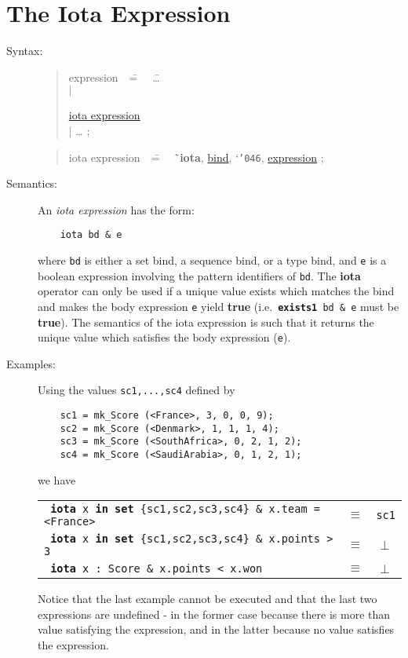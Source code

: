 \documentclass{overturerepchap}
\newcommand{\Lit}[1]{`{\tt #1}\Quote}
\newcommand{\Rule}[2]{
  \begin{quote}\begin{tabbing}
    #1\index{#1}\ \ \= = \ \ \= #2  ; %

  \end{tabbing}\end{quote}
  }
\newcommand{\Ruleref}[1]{
  \hyperlink{rule:#1}{#1}}
\newcommand{\dsep}{\\ \> $|$ \>}
\newcommand{\Lop}[1]{`{\bf\ttfamily #1}\Quote}
\newcommand{\keyw}[1]{{\bf\ttfamily #1}}
\begin{document}
{\begin{description}
\end{description}

\section{The Iota Expression}\label{iotaexpr}

\begin{description}
\item[Syntax:]
  \Rule{expression}{
    \ldots \dsep
    \Ruleref{iota expression} \dsep
    \ldots
    }

  \Rule{iota expression}{
    \Lop{iota}, \Ruleref{bind}, \Lit{\char'046}, \Ruleref{expression}
    }

\item[Semantics:] An {\it iota expression} has the form:
  \begin{lstlisting}
    iota bd & e
  \end{lstlisting}
  where {\tt bd} is either a set bind, a sequence bind, or a type bind, and {\tt e} is a
  boolean expression involving the pattern identifiers of {\tt bd}.
  The \keyw{iota} operator can only be used if a unique value exists
  which matches the bind and makes the body expression {\tt e} yield
  \keyw{true} (i.e.\ {\tt \keyw{exists1} bd \& e} must be \keyw{true}). The
  semantics of the iota expression is such that it returns the unique
  value which satisfies the body expression ({\tt e}).

\item[Examples:]
  Using the values \texttt{sc1,...,sc4} defined by
  \begin{lstlisting}
    sc1 = mk_Score (<France>, 3, 0, 0, 9);
    sc2 = mk_Score (<Denmark>, 1, 1, 1, 4);
    sc3 = mk_Score (<SouthAfrica>, 0, 2, 1, 2);
    sc4 = mk_Score (<SaudiArabia>, 0, 1, 2, 1);
  \end{lstlisting}
  we have

  \begin{tabular}{lcl}
    \texttt{ \keyw{iota} x \keyw{in set} \{sc1,sc2,sc3,sc4\} \&
      x.team = <France>} & $\equiv$ & \texttt{sc1}\\
    \texttt{ \keyw{iota} x \keyw{in set} \{sc1,sc2,sc3,sc4\} \&
      x.points > 3} & $\equiv$ & $\perp$\\
    \texttt{ \keyw{iota} x : Score \& x.points < x.won} & $\equiv$ &
  $\perp$
  \end{tabular}

  \noindent Notice that the last example cannot be executed and that
  the last two expressions are undefined - in the former case because
  there is more than value satisfying the expression, and in the
  latter because no value satisfies the expression.
\end{description}

}
\end{document}
